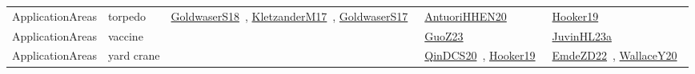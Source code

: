 {\begin{longtable}{lp{3cm}>{\raggedright\arraybackslash}p{6cm}>{\raggedright\arraybackslash}p{6cm}>{\raggedright\arraybackslash}p{8cm}}
ApplicationAreas & torpedo & \href{works/GoldwaserS18.pdf}{GoldwaserS18}~\cite{GoldwaserS18}, \href{works/KletzanderM17.pdf}{KletzanderM17}~\cite{KletzanderM17}, \href{works/GoldwaserS17.pdf}{GoldwaserS17}~\cite{GoldwaserS17} & \href{works/AntuoriHHEN20.pdf}{AntuoriHHEN20}~\cite{AntuoriHHEN20} & \href{works/Hooker19.pdf}{Hooker19}~\cite{Hooker19}\\
ApplicationAreas & vaccine &  & \href{works/GuoZ23.pdf}{GuoZ23}~\cite{GuoZ23} & \href{works/JuvinHL23a.pdf}{JuvinHL23a}~\cite{JuvinHL23a}\\
ApplicationAreas & yard crane &  & \href{works/QinDCS20.pdf}{QinDCS20}~\cite{QinDCS20}, \href{works/Hooker19.pdf}{Hooker19}~\cite{Hooker19} & \href{works/EmdeZD22.pdf}{EmdeZD22}~\cite{EmdeZD22}, \href{works/WallaceY20.pdf}{WallaceY20}~\cite{WallaceY20}\\
\end{longtable}
}

